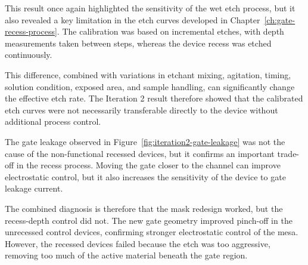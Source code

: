 \vspace{1mm}

This result once again highlighted the sensitivity of the wet etch process, but
it also revealed a key limitation in the etch curves developed in
Chapter~\ref{ch:gate-recess-process}. The calibration was based on incremental
etches, with depth measurements taken between steps, whereas the device recess
was etched continuously.

This difference, combined with variations in etchant mixing, agitation, timing,
solution condition, exposed area, and sample handling, can significantly change
the effective etch rate. The Iteration 2 result therefore showed that the
calibrated etch curves were not necessarily transferable directly to the device
without additional process control.

\vspace{1mm}

The gate leakage observed in Figure~\ref{fig:iteration2-gate-leakage} was not
the cause of the non-functional recessed devices, but it confirms an
important trade-off in the recess process. Moving the gate closer to the channel
can improve electrostatic control, but it also increases the sensitivity of the
device to gate leakage current.

\vspace{1mm}

The combined diagnosis is therefore that the mask redesign worked, but the
recess-depth control did not. The new gate geometry improved pinch-off in the
unrecessed control devices, confirming stronger electrostatic control of the
mesa. However, the recessed devices failed because the etch was too aggressive,
removing too much of the active material beneath the gate region.
